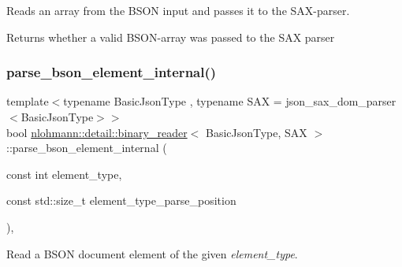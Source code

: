 Reads an array from the B\+S\+ON input and passes it to the S\+A\+X-\/parser. 

\begin{DoxyReturn}{Returns}
whether a valid B\+S\+O\+N-\/array was passed to the S\+AX parser 
\end{DoxyReturn}
\mbox{\label{classnlohmann_1_1detail_1_1binary__reader_a2fdd24de008063e7fef896327daeffa1}} 
\subsubsection{\texorpdfstring{parse\_bson\_element\_internal()}{parse\_bson\_element\_internal()}}
{\footnotesize\ttfamily template$<$typename Basic\+Json\+Type , typename S\+AX  = json\+\_\+sax\+\_\+dom\+\_\+parser$<$\+Basic\+Json\+Type$>$$>$ \\
bool \mbox{\hyperlink{classnlohmann_1_1detail_1_1binary__reader}{nlohmann\+::detail\+::binary\+\_\+reader}}$<$ Basic\+Json\+Type, S\+AX $>$\+::parse\+\_\+bson\+\_\+element\+\_\+internal (\begin{DoxyParamCaption}\item[{const int}]{element\+\_\+type,  }\item[{const std\+::size\+\_\+t}]{element\+\_\+type\+\_\+parse\+\_\+position }\end{DoxyParamCaption})\hspace{0.3cm}{\ttfamily [inline]}, {\ttfamily [private]}}



Read a B\+S\+ON document element of the given {\itshape element\+\_\+type}. 


